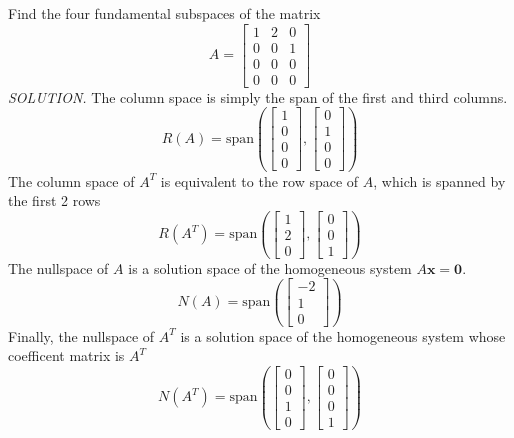\documentclass{article}
\newcommand\B{\textbf}
\newcommand\T{\textit}
\begin{document}
    Find the four fundamental subspaces of the matrix
    \[ A = \begin{bmatrix}
        1 & 2 & 0 \\
        0 & 0 & 1\\
        0 & 0 & 0\\
        0 & 0 & 0
    \end{bmatrix} \]
    \T{\textcolor{blue5}{SOLUTION.}} The column space is simply the span of the first and third columns.
    \[ R(A) = \text{span}\left(
            \begin{bmatrix}
                1 \\ 0 \\ 0 \\ 0
            \end{bmatrix},
            \begin{bmatrix}
                0 \\ 1 \\ 0 \\ 0
            \end{bmatrix}
            \right) \]
    The column space of $A^T$ is equivalent to the row space of $A$, which is spanned by the first 2 rows
    \[ R(A^T) = \text{span}\left(
            \begin{bmatrix}
                1 \\ 2 \\ 0
            \end{bmatrix},
            \begin{bmatrix}
                0 \\ 0 \\ 1
            \end{bmatrix}
            \right) \]
    The nullspace of $A$ is a solution space of the homogeneous system $A\B{x} = \B{0}$.
    \[ N(A) = \text{span}\left(
            \begin{bmatrix}
                -2 \\
                1 \\
                0
            \end{bmatrix}
            \right) \]
    Finally, the nullspace of $A^T$ is a solution space of the homogeneous system whose coefficent matrix is $A^T$
    \[ N(A^T) = \text{span}\left(
            \begin{bmatrix}
                0 \\ 0 \\ 1 \\ 0
            \end{bmatrix},
            \begin{bmatrix}
                0 \\ 0 \\ 0 \\ 1
            \end{bmatrix}
            \right) \]
\end{document}
